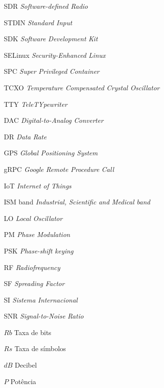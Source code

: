 \documentclass[
  12pt,				%
  openright,			%
  twoside,			%
  a4paper,			%
  english,			%
  french,				%
  spanish,			%
  brazil,				%
  ]{abntex2}
\begin{document}
\begin{siglas}
  \item[SDR]        \textit{Software-defined Radio}
  \item[STDIN]      \textit{Standard Input}
  \item[SDK]        \textit{Software Development Kit}
  \item[SELinux]    \textit{Security-Enhanced Linux}
  \item[SPC]        \textit{Super Privileged Container}
  \item[TCXO]       \textit{Temperature Compensated Crystal Oscillator}
  \item[TTY]        \textit{TeleTYpewriter}
  \item[DAC]        \textit{Digital-to-Analog Converter}
  \item[DR]         \textit{Data Rate}
  \item[GPS]        \textit{Global Positioning System}
  \item[gRPC]       \textit{Google Remote Procedure Call}
  \item[IoT]        \textit{Internet of Things}
  \item[ISM band]   \textit{Industrial, Scientific and Medical band}
  \item[LO]         \textit{Local Oscillator}
  \item[PM]         \textit{Phase Modulation}
  \item[PSK]        \textit{Phase-shift keying}
  \item[RF]         \textit{Radiofrequency}
  \item[SF]         \textit{Spreading Factor}
  \item[SI]         \textit{Sistema Internacional}
  \item[SNR]        \textit{Signal-to-Noise Ratio}

\end{siglas}

\begin{simbolos}
  \item[$ Rb $] Taxa de bits
  \item[$ Rs $] Taxa de símbolos
  \item[$ dB $] Decibel
  \item[$ P $] Potência
\end{simbolos}

\tableofcontents*
\cleardoublepage


\textual
\end{document}
